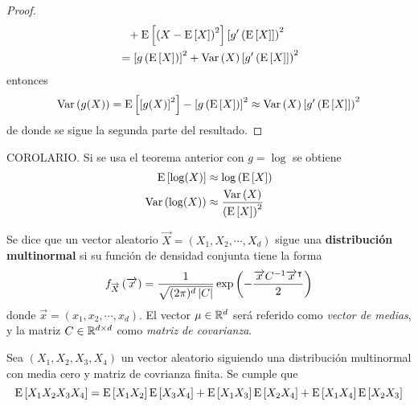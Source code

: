 \begin{proof}
\begin{align*}
&\pheq + \E{\left(X - \E{X} \right)^{2}} \left[ g\prima \left( \E{X} \right] \right)^{2} \\
&= \left[g\left( \E{X} \right)\right]^{2} + \Var{X} \left[ g\prima \left( \E{X} \right] \right)^{2}
\end{align*}
entonces
\begin{equation}
\mathrm{Var}\left( g(X) \right) = \mathrm{E}\left[ \left[g(X)\right]^{2} \right] - \left[g\left( \mathrm{E}\left[ X \right] \right)\right]^{2} \approx \mathrm{Var}\left( X \right) \left[ g^{\prime} \left( \mathrm{E}\left[ X \right] \right] \right)^{2}
\end{equation}
de donde se sigue la segunda parte del resultado.
\end{proof}

\begin{proposicion}
COROLARIO. Si se usa el teorema anterior con $g = \log$ se obtiene
\begin{align}
\mathrm{E}\left[ \log(X) \right] &\approx \log\left( \mathrm{E}\left[ X \right] \right) \\
\mathrm{Var}\left( \log(X) \right) &\approx \frac{\mathrm{Var}\left( X \right)}{\left( \mathrm{E}\left[ X \right] \right)^{2}}
\end{align}
\end{proposicion}

\begin{definicion}
Se dice que un vector aleatorio $\overrightarrow{X} = (X_1, X_2, \cdots, X_d)$ sigue una \textbf{distribución multinormal} si su función de densidad conjunta tiene la forma
\begin{equation}
f_{\overrightarrow{X}}\left( \overrightarrow{x} \right) = \frac{1}{\sqrt{(2\pi)^{d}\left| C \right|}} \exp\left( -\frac{\overrightarrow{x} C^{-1} \overrightarrow{x}^{\intercal} }{2} \right)
\end{equation}
donde $\overrightarrow{x} = (x_1, x_2, \cdots, x_d)$. El vector $\mu \in \mathbb{R}^{d}$ será referido como \textit{vector de medias}, y la matriz $C \in \mathbb{R}^{d\times d}$ como \textit{matriz de covarianza}.
\end{definicion}

\begin{teorema}[Isserlis]
Sea $(X_1, X_2, X_3, X_4)$ un vector aleatorio siguiendo una distribución multinormal con media cero y matriz de covrianza finita. Se cumple que
\begin{equation}
\mathrm{E}\left[ X_1 X_2 X_3 X_4 \right] = \mathrm{E}\left[ X_1 X_2 \right] \mathrm{E}\left[ X_3 X_4 \right] + \mathrm{E}\left[ X_1 X_3 \right] \mathrm{E}\left[ X_2 X_4 \right] + \mathrm{E}\left[ X_1 X_4 \right] \mathrm{E}\left[ X_2 X_3 \right]
\end{equation}
\label{teo:isserlis}
\end{teorema}

%

